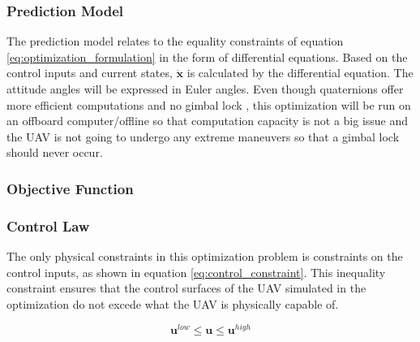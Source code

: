 \subsubsection{Prediction Model}

The prediction model relates to the equality constraints of equation \ref{eq:optimization_formulation} in the form of differential equations. Based on the control inputs and current states, $\mathbf{\dot{x}}$ is calculated by the differential equation. The attitude angles will be expressed in Euler angles. Even though quaternions offer more efficient computations and no gimbal lock \cite{uavBEARD}, this optimization will be run on an offboard computer/offline so that computation capacity is not a big issue and the UAV is not going to undergo any extreme maneuvers so that a gimbal lock should never occur.


\subsubsection{Objective Function}


\subsubsection{Control Law}

The only physical constraints in this optimization problem is constraints on the control inputs, as shown in equation \ref{eq:control_constraint}. This inequality constraint ensures that the control surfaces of the UAV simulated in the optimization do not excede what the UAV is physically capable of.

\begin{equation}
	\label{eq:control_constraint}
	\mathbf{u}^{low} \leq \mathbf{u} \leq \mathbf{u}^{high}
\end{equation}
